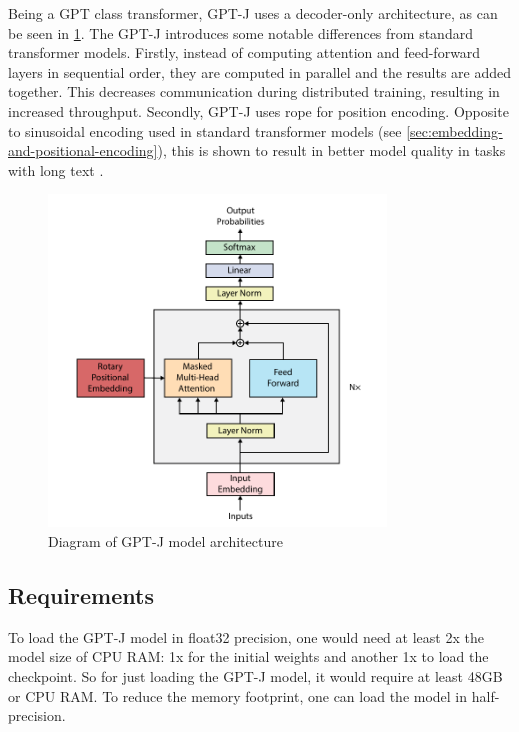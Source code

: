 Being a GPT class transformer, GPT-J uses a decoder-only architecture, as can be seen in \cref{fig:gpt-j-architecture}. The GPT-J introduces some notable differences from standard transformer models. Firstly, instead of computing attention and feed-forward layers in sequential order, they are computed in parallel and the results are added together. This decreases communication during distributed training, resulting in increased throughput. Secondly, GPT-J uses \acrfull{rope} \cite{su2021roformer} for position encoding. Opposite to sinusoidal encoding used in standard transformer models (see \cref{sec:embedding-and-positional-encoding}), this is shown to result in better model quality in tasks with long text \cite{su2021roformer}.

\begin{figure}[htp]
    \centering
    \includegraphics[width=0.8\textwidth]{figures/gpt-j_architecture.pdf}
    \caption{Diagram of GPT-J model architecture}
    \label{fig:gpt-j-architecture}
\end{figure}

\subsection{Requirements}
\label{sec:requirements}
To load the GPT-J model in float32 precision, one would need at least 2x the model size of CPU RAM: 1x for the initial weights and another 1x to load the checkpoint. So for just loading the GPT-J model, it would require at least 48GB or CPU RAM. To reduce the memory footprint, one can load the model in half-precision.

